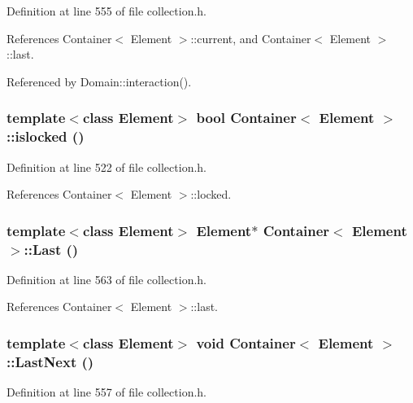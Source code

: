 Definition at line 555 of file collection.h.

References Container$<$ Element $>$::current, and Container$<$ Element $>$::last.

Referenced by Domain::interaction().\hypertarget{classContainer_9d4313e386763fec8caaf8c1c647c617}{
\subsubsection[{islocked}]{\setlength{\rightskip}{0pt plus 5cm}template$<$class Element$>$ bool {\bf Container}$<$ Element $>$::islocked ()}}
\label{classContainer_9d4313e386763fec8caaf8c1c647c617}




Definition at line 522 of file collection.h.

References Container$<$ Element $>$::locked.\hypertarget{classContainer_69c8bc0d0f09e172057777ee8604b228}{
\subsubsection[{Last}]{\setlength{\rightskip}{0pt plus 5cm}template$<$class Element$>$ Element$\ast$ {\bf Container}$<$ Element $>$::Last ()}}
\label{classContainer_69c8bc0d0f09e172057777ee8604b228}




Definition at line 563 of file collection.h.

References Container$<$ Element $>$::last.\hypertarget{classContainer_275dceb5293e10b90c1d5ed544bda080}{
\subsubsection[{LastNext}]{\setlength{\rightskip}{0pt plus 5cm}template$<$class Element$>$ void {\bf Container}$<$ Element $>$::LastNext ()}}
\label{classContainer_275dceb5293e10b90c1d5ed544bda080}




Definition at line 557 of file collection.h.


